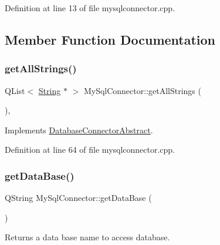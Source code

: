 Definition at line 13 of file mysqlconnector.\+cpp.



\subsection{Member Function Documentation}
\mbox{\label{classMySqlConnector_ad6ff79c4049e3631800da97e8d7b7704}} 
\subsubsection{\texorpdfstring{get\+All\+Strings()}{getAllStrings()}}
{\footnotesize\ttfamily Q\+List$<$ \mbox{\hyperlink{classString}{String}} $\ast$ $>$ My\+Sql\+Connector\+::get\+All\+Strings (\begin{DoxyParamCaption}{ }\end{DoxyParamCaption})\hspace{0.3cm}{\ttfamily [override]}, {\ttfamily [virtual]}}







Implements \mbox{\hyperlink{classDatabaseConnectorAbstract_aeb4347bc18b6bed9a9b6120f68c10e9d}{Database\+Connector\+Abstract}}.



Definition at line 64 of file mysqlconnector.\+cpp.

\mbox{\label{classMySqlConnector_a9bada8a552b17c5e39e7d1c903201b4b}} 
\subsubsection{\texorpdfstring{get\+Data\+Base()}{getDataBase()}}
{\footnotesize\ttfamily Q\+String My\+Sql\+Connector\+::get\+Data\+Base (\begin{DoxyParamCaption}{ }\end{DoxyParamCaption})}



Returns a data base name to access database. 

